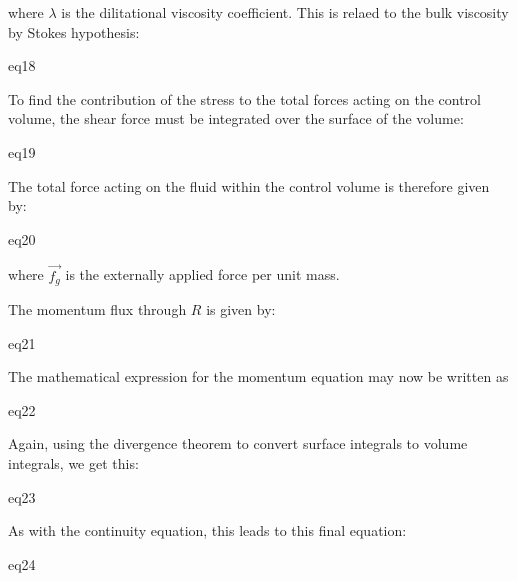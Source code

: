 where $\lambda$ is the dilitational viscosity coefficient. This is relaed to
the bulk viscosity by Stokes hypothesis:

{eq18}

To find the contribution of the stress to the total forces acting on the
control volume, the shear force must be integrated over the surface of the
volume:

{eq19}

The total force acting on the fluid within the control volume is therefore given by:

{eq20}

where $\overrightarrow{f_g}$ is the externally applied force per unit mass.

The momentum flux through $R$ is given by:

{eq21}

The mathematical expression for the momentum equation may now be written as

{eq22}


Again, using the divergence theorem to convert surface integrals to volume integrals, we get this:

{eq23}

As with the continuity equation, this leads to this final equation:

{eq24}


